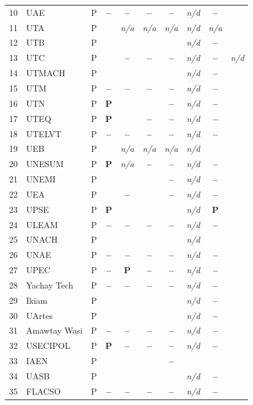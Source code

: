\documentclass[pdflatex,sn-basic,Numbered]{sn-jnl}
\newcommand{\si}{\ding{51}}
\newcommand{\no}{\textcolor{gris}{\textbf{--}}}
\newcommand{\pc}{\textbf{P}}
\newcommand{\nv}{\textsl{\footnotesize n/a}}
\newcommand{\nd}{\textsl{\footnotesize n/d}}
\theoremstyle{thmstyleone}
\theoremstyle{thmstyletwo}
\theoremstyle{thmstylethree}
\begin{document}
\begin{appendices}
\begin{longtable}{@{}r l c c c c c c c c@{}}
	10 & UAE & P & \no & \no & \no & \no & \nd & \no & \si \\
	11 & UTA & P & \si & \nv & \nv & \nv & \nd & \nv & \si \\
	12 & UTB & P & \si & \si & \si & \si & \nd & \no & \si \\
	13 & UTC & P & \si & \no & \no & \no & \nd & \no & \nd \\
	14 & UTMACH & P & \si & \si & \si & \si & \nd & \no & \si \\
	15 & UTM & P & \no & \no & \no & \no & \nd & \no & \si \\
	16 & UTN & P & \pc & \si & \si & \no & \nd & \no & \si \\
	17 & UTEQ & P & \pc & \si & \no & \no & \nd & \no & \si \\
	18 & UTELVT & P & \no & \no & \no & \no & \nd & \no & \si \\
	19 & UEB & P & \si & \nv & \nv & \nv & \nd & \si & \si \\
	20 & UNESUM & P & \pc & \nv & \no & \no & \nd & \no & \si \\
	21 & UNEMI & P & \si & \si & \si & \no & \nd & \no & \si \\
	22 & UEA & P & \si & \no & \si & \no & \nd & \no & \si \\
	23 & UPSE & P & \pc & \si & \si & \si & \nd & \pc & \si \\
	24 & ULEAM & P & \no & \no & \no & \no & \nd & \no & \si \\
	25 & UNACH & P & \si & \si & \si & \si & \nd & \si & \si \\
	26 & UNAE & P & \no & \no & \no & \no & \nd & \no & \si \\
	27 & UPEC & P & \no & \pc & \no & \no & \nd & \no & \si \\
	28 & Yachay Tech & P & \no & \no & \no & \no & \nd & \no & \si \\
	29 & Ikiam & P & \si & \si & \si & \si & \nd & \no & \si \\
	30 & UArtes & P & \si & \si & \si & \si & \nd & \no & \si \\
	31 & Amawtay Wasi & P & \no & \no & \no & \no & \nd & \no & \si \\
	32 & USECIPOL & P & \pc & \no & \no & \no & \nd & \no & \si \\
	33 & IAEN & P & \si & \si & \si & \no & \si & \si & \si \\
	34 & UASB & P & \si & \si & \si & \si & \nd & \no & \si \\
	35 & FLACSO & P & \no & \no & \no & \no & \nd & \no & \si \\

\end{longtable}
\end{appendices}
\end{document}
